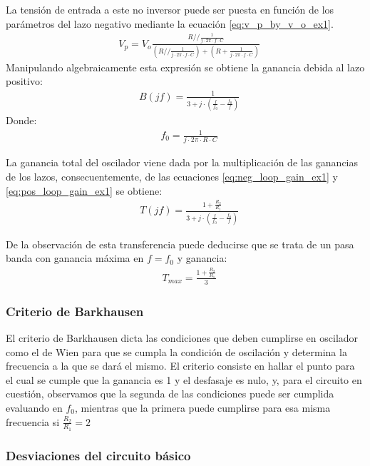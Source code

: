 La tensión de entrada a este no inversor puede ser puesta en función de los parámetros del lazo negativo mediante la ecuación \ref{eq:v_p_by_v_o_ex1}.
\begin{align*}
    & V_p = V_o \frac{R // \frac{1}{j \cdot 2\pi \cdot f \cdot C}}{\left( R // \frac{1}{j \cdot 2\pi \cdot f \cdot C} \right) + \left( R + \frac{1}{j \cdot 2\pi \cdot f \cdot C}\right)}
\end{align*}
Manipulando algebraicamente esta expresión se obtiene la ganancia debida al lazo positivo:
\begin{align}
    & B(jf) = \frac{1}{3 + j \cdot \left(\frac{f}{f_0} - \frac{f_0}{f}\right)}
    \label{eq:pos_loop_gain_ex1}
\end{align}
Donde:
\begin{align}
    & f_0 = \frac{1}{j \cdot 2\pi \cdot R \cdot C}
    \label{eq:osc_freq_ex1}
\end{align}

La ganancia total del oscilador viene dada por la multiplicación de las ganancias de los lazos, consecuentemente, de las ecuaciones \ref{eq:neg_loop_gain_ex1} y \ref{eq:pos_loop_gain_ex1}
se obtiene:
\begin{align}
    & T(jf) = \frac{1 + \frac{R_2}{R_1}}{3 + j \cdot \left(\frac{f}{f_0} - \frac{f_0}{f}\right)}
    \label{eq:total_gain_ex1}
\end{align}

De la observación de esta transferencia puede deducirse que se trata de un pasa banda con ganancia máxima en $f = f_0$ y ganancia:
\begin{align}
    & T_{max} = \frac{1 + \frac{R_2}{R_1}}{3}
    \label{eq:max_gain_ex1}
\end{align}


\subsubsection{Criterio de Barkhausen}
El criterio de Barkhausen dicta las condiciones que deben cumplirse en oscilador como el de Wien para que se cumpla la condición de oscilación y determina la frecuencia a 
la que se dará el mismo.
El criterio consiste en hallar el punto para el cual se cumple que la ganancia es 1 y el desfasaje es nulo, y, para el circuito en cuestión, observamos que la segunda de 
las condiciones puede ser cumplida evaluando en $f_0$, mientras que la primera puede cumplirse para esa misma frecuencia si $\frac{R_2}{R_1} = 2$


\subsubsection{Desviaciones del circuito básico}



